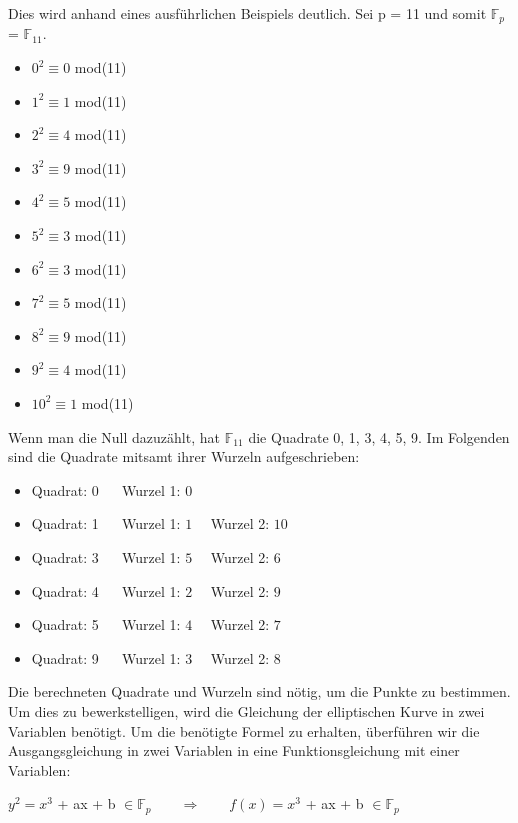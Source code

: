 Dies wird anhand eines ausführlichen Beispiels deutlich. Sei p = 11 und somit $\mathbb{F}_{p}$ = $\mathbb{F}_{11}$. 

\begin{itemize}
\item $0^{2} \equiv 0 $  mod(11)
\item $1^{2} \equiv 1 $  mod(11)
\item $2^{2} \equiv 4 $  mod(11)
\item $3^{2} \equiv 9 $  mod(11)
\item $4^{2} \equiv 5 $  mod(11)
\item $5^{2} \equiv 3 $  mod(11)
\item $6^{2} \equiv 3 $  mod(11)
\item $7^{2} \equiv 5 $  mod(11)
\item $8^{2} \equiv 9 $  mod(11)
\item $9^{2} \equiv 4 $  mod(11)
\item $10^{2} \equiv 1 $  mod(11)
\end{itemize}

Wenn man die Null dazuzählt, hat $\mathbb{F}_{11}$ die Quadrate 0, 1, 3, 4, 5, 9. Im Folgenden sind die Quadrate mitsamt ihrer Wurzeln aufgeschrieben:

\begin{itemize}
\item Quadrat: 0 $\quad$ Wurzel 1: $0$
\item Quadrat: 1 $\quad$ Wurzel 1: $1 \quad$ Wurzel 2: $10$
\item Quadrat: 3 $\quad$ Wurzel 1: $5 \quad$ Wurzel 2: $6$
\item Quadrat: 4 $\quad$ Wurzel 1: $2 \quad$ Wurzel 2: $9$
\item Quadrat: 5 $\quad$ Wurzel 1: $4 \quad$ Wurzel 2: $7$
\item Quadrat: 9 $\quad$ Wurzel 1: $3 \quad$ Wurzel 2: $8$
\end{itemize}

Die berechneten Quadrate und Wurzeln sind nötig, um die Punkte zu bestimmen. Um dies zu bewerkstelligen, wird die Gleichung der elliptischen Kurve in zwei Variablen benötigt. Um die benötigte Formel zu erhalten, überführen wir die Ausgangsgleichung in zwei Variablen in eine Funktionsgleichung mit einer Variablen:
\begin{center}
$y^{2} =  x^{3}$ + ax + b  $\in \mathbb{F}_{p} \qquad \Longrightarrow \qquad f(x) =  x^{3}$ + ax + b  $\in \mathbb{F}_{p}$
\end{center}

